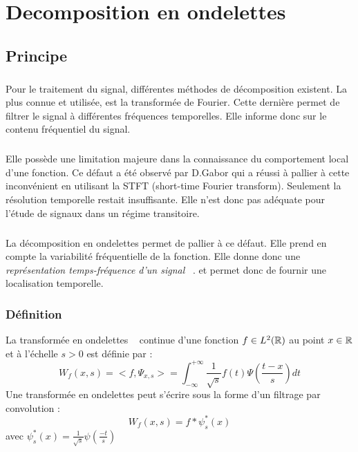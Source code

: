 
\chapter{Decomposition en ondelettes}



\section{Principe}
\paragraph{}
Pour le traitement du signal, différentes méthodes de décomposition existent.
La plus connue et utilisée, est la transformée de Fourier. Cette dernière permet de filtrer le signal à différentes fréquences temporelles. Elle informe donc sur le contenu fréquentiel du signal.
\paragraph{}
Elle possède une limitation majeure dans la connaissance du comportement local d'une fonction.
Ce défaut a été observé par D.Gabor qui a réussi à pallier à cette inconvénient en utilisant la STFT (short-time Fourier transform). Seulement la résolution temporelle restait insuffisante.
Elle n'est donc pas adéquate pour l'étude de signaux dans un régime transitoire. ~\cite{GaoR}
\paragraph{}
La décomposition en ondelettes permet de pallier à ce défaut.
Elle prend en compte la variabilité fréquentielle de la fonction. 
Elle donne donc une \emph{représentation temps-fréquence d'un signal} ~\cite{JBigot}.
et permet donc de fournir une localisation temporelle.

\subsection{Définition}
La transformée en ondelettes ~\cite{JBigot} continue d'une fonction $f  \in L^{2}(\mathbb{R})$ au point $x \in \mathbb{R} $
et à l'échelle $ s>0 $ est définie par  :
\begin{equation}
W_{f}(x,s) = <f,\Psi_{x,s}> = \int^{+\infty}_{- \infty} \frac{1}{\sqrt{s}}f(t)\Psi(\frac{t-x}{s})dt
\end{equation} 
Une transformée en ondelettes peut s'écrire sous la forme d'un filtrage par convolution :
\begin{equation}
W_{f}(x,s) = f * \psi^{*}_{s}(x)
\end{equation}
avec  $\psi^{*}_{s}(x) = \frac{1}{\sqrt{s}} \psi(\frac{-t}{s})$

